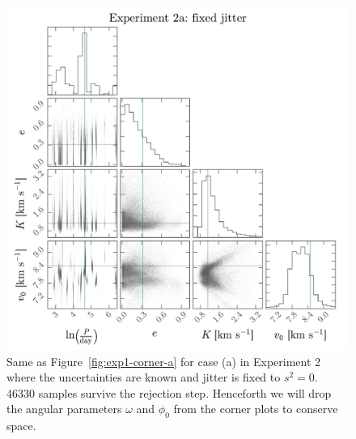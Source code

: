 \documentclass[manuscript, letterpaper]{aastex6}
\newcommand{\figname}{Figure}
\begin{document}
\begin{figure}[p]
\begin{center}
\includegraphics[width=\textwidth]{figures/exp2-corner-a.pdf}
\end{center}
\caption{%
Same as \figname~\ref{fig:exp1-corner-a} for case (a) in Experiment 2 where the
uncertainties are known and jitter is fixed to $s^2 = 0$.
46330 samples survive the rejection step.
Henceforth we will drop the angular parameters $\omega$ and $\phi_0$ from the
corner plots to conserve space.
\label{fig:exp2-corner-a}}
\end{figure}
\end{document}
